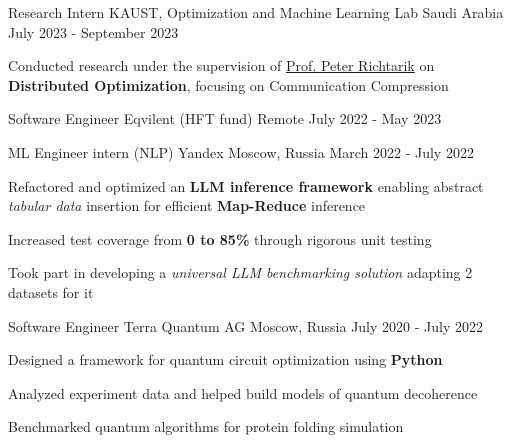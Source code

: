 
\begin{cventries}
  \cventry
    {Research Intern}
    {KAUST, Optimization and Machine Learning Lab}
    {Saudi Arabia}
    {July 2023 - September 2023}
    {
      \begin{cvitems}
        \item Conducted research under the supervision of  \href{https://richtarik.org/}{Prof. Peter Richtarik} on \textbf{Distributed Optimization}, focusing on Communication Compression
      \end{cvitems}
    }

  \cventry
    {Software Engineer}
    {Eqvilent (HFT fund)}
    {Remote}
    {July 2022 - May 2023}
    {}

  \cventry
    {ML Engineer intern (NLP)}
    {Yandex}
    {Moscow, Russia}
    {March 2022 - July 2022}
    {
      \begin{cvitems} %
        \item {Refactored and optimized an \textbf{LLM inference framework} 
        enabling abstract \textit{tabular data} insertion for efficient \textbf{Map-Reduce} inference}
        \item {Increased test coverage from \textbf{0 to 85\%} through rigorous unit testing}
        \item {Took part in developing a \textit{universal LLM benchmarking solution} adapting 2 datasets for it}
      \end{cvitems}
    }
    
  \cventry
    {Software Engineer} %
    {Terra Quantum AG} %
    {Moscow, Russia} %
    {July 2020 - July 2022} %
    {
      \begin{cvitems} %
        \item {Designed a framework for quantum circuit optimization using \textbf{Python}}
        \item {Analyzed experiment data and helped build models of quantum decoherence}
        \item {Benchmarked quantum algorithms for protein folding simulation}
      \end{cvitems}
    }
    
\end{cventries}
